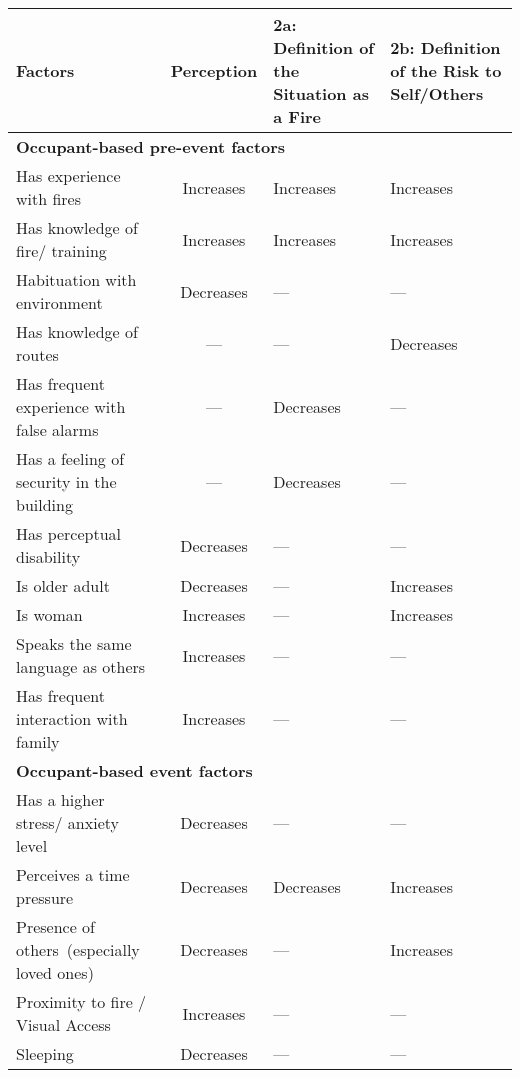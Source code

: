 \begin{table}[htbp]
\centering
\begin{threeparttable}[b]
\begin{tabular}{m{6.3cm} c >{\centering\arraybackslash}m{2.8cm} >{\centering\arraybackslash}m{2.8cm}} %
\toprule
Factors & Perception  & 2a: Definition of the Situation as a Fire & 2b: Definition of the Risk to Self/Others\\

\midrule
\multicolumn {4}{l}{{\bf Occupant-based pre-event factors}}\\
\midrule
Has experience with fires    & Increases  & Increases &  Increases\\
Has knowledge of fire/ training & Increases  & Increases &  Increases\\
Habituation with environment   & Decreases  & ---\tnote{1}    &  --- \\
Has knowledge of routes     &   ---   &  ---    & Decreases\\
Has frequent experience with false alarms & ---  & Decreases &  ---\\
Has a feeling of security in the building & ---  & Decreases &  ---\\
Has perceptual disability   & Decreases  & --- &  ---\\
Is older adult        & Decreases  & --- &  Increases\\
Is woman           & Increases  & --- &  Increases\\
Speaks the same language as others & Increases  & --- &  ---\\
Has frequent interaction with family & Increases  & --- &  ---\\
\midrule
\multicolumn {4}{l}{{\bf Occupant-based event factors}}\\
\midrule
Has a higher stress/ anxiety level  & Decreases & --- & --- \\
Perceives a time pressure & Decreases & Decreases & Increases \\
Presence of others~(especially loved ones) & Decreases & --- & Increases \\
Proximity to fire / Visual Access  & Increases & --- & --- \\
Sleeping & Decreases & ---& ---\\

\end{tabular}
\end{threeparttable}
\end{table}
